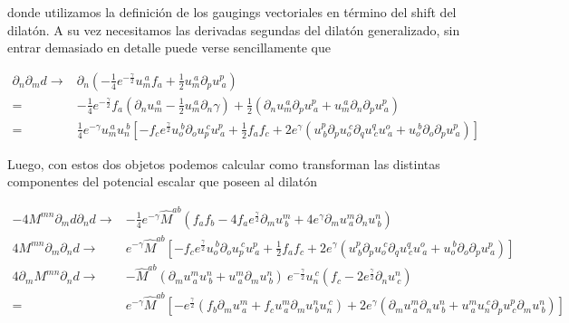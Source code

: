 \documentclass{article}
\numberwithin{equation}{section}
\begin{document}
donde utilizamos la definición de los gaugings vectoriales en término del shift del dilatón. A su vez necesitamos las derivadas segundas del dilatón generalizado, sin entrar demasiado en detalle puede verse sencillamente que

\begin{equation}
\begin{aligned}
\partial_n \partial_m d \longrightarrow& \partial_n \left( -\frac{1}{4} e^{-\frac{\gamma}{2}} u_{m}^{\ a} f_a  + \frac{1}{2} u_{m}^{\ a} \partial_p u^{p}_{\ a} \right)\\
=& -\frac{1}{4} e^{-\frac{\gamma}{2}} f_a \left( \partial_n u_{m}^{\ a} - \frac{1}{2} u_{m}^{\ a} \partial_n \gamma \right) + \frac{1}{2} \left( \partial_n u_{m}^{\ a} \partial_p u^{p}_{\ a} + u_{m}^{\ a} \partial_n \partial_p u^{p}_{\ a} \right)\\
=& \frac{1}{4} e^{-\gamma}u_{m}^{\ a} u_{n}^{\ b} \left[ -f_c e^{\frac{\gamma}{2}} u_{o}^{\ b} \partial_o u_{p}^{\ c} u^{p}_{\ a} + \frac{1}{2} f_a f_c + 2 e^{\gamma} \left( u^{p}_{\ b} \partial_p u_{o}^{\ c} \partial_q u^{q}_{\ c} u^{o}_{\ a} + u_{o}^{\ b} \partial_o \partial_p u^{p}_{\ a} \right)\right]
\end{aligned}
\end{equation}

Luego, con estos dos objetos podemos calcular como transforman las distintas componentes del potencial escalar que poseen al dilatón

\begin{equation}\label{V123}
\begin{aligned}
-4M^{m n} \partial_m d \partial_n d \longrightarrow& -\frac{1}{4} e^{-\gamma} \hat{M}^{a b} \left( f_a f_b - 4 f_a e^{\frac{\gamma}{2}} \partial_m u^{m}_{\ b} + 4e^{\gamma} \partial_m u^{m}_{\ a} \partial_n u^{n}_{\ b} \right)\\
4 M^{m n}\partial_m \partial_n d \longrightarrow& e^{-\gamma}\hat{M}^{a b} \left[ -f_c e^{\frac{\gamma}{2}} u_{o}^{\ b} \partial_o u_{p}^{\ c} u^{p}_{\ a} + \frac{1}{2} f_a f_c + 2 e^{\gamma} \left( u^{p}_{\ b} \partial_p u_{o}^{\ c} \partial_q u^{q}_{\ c} u^{o}_{\ a} + u_{o}^{\ b} \partial_o \partial_p u^{p}_{\ a} \right)\right]\\
4 \partial_m M^{m n} \partial_n d \longrightarrow& -\hat{M}^{a b} \left( \partial_m u^{m}_{\ a} u^{n}_{\ b} + u^{m}_{\ a} \partial_m u^{n}_{\ b}\right) \ e^{-\frac{\gamma}{2}}  u_{n}^{\ c} \left( f_c  -2 e^{\frac{\gamma}{2}} \partial_n u^{n}_{\ c} \right)\\
=& e^{-\gamma}\hat{M}^{a b} \left[ -e^{\frac{\gamma}{2}} \left( f_b \partial_m u^{m}_{\ a} + f_c u^{m}_{\ a} \partial_m u^{n}_{\ b} u_{n}^{\ c} \right) + 2 e^{\gamma} \left( \partial_m u^{m}_{\ a} \partial_n u^{n}_{\ b} + u^{m}_{\ a} u_{n}^{\ c} \partial_p u^{p}_{\ c} \partial_m u^{n}_{\ b} \right) \right]
\end{aligned}
\end{equation}
\end{document}

